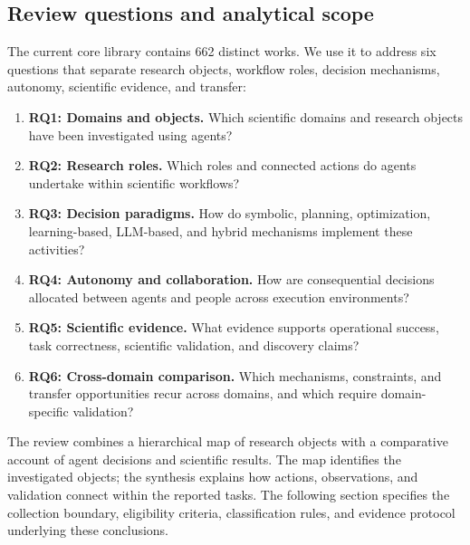 \subsection{Review questions and analytical scope}

The current core library contains 662 distinct works. We use it to address six questions that separate research objects, workflow roles, decision mechanisms, autonomy, scientific evidence, and transfer:
\begin{enumerate}
    \item \textbf{RQ1: Domains and objects.} Which scientific domains and research objects have been investigated using agents?
    \item \textbf{RQ2: Research roles.} Which roles and connected actions do agents undertake within scientific workflows?
    \item \textbf{RQ3: Decision paradigms.} How do symbolic, planning, optimization, learning-based, LLM-based, and hybrid mechanisms implement these activities?
    \item \textbf{RQ4: Autonomy and collaboration.} How are consequential decisions allocated between agents and people across execution environments?
    \item \textbf{RQ5: Scientific evidence.} What evidence supports operational success, task correctness, scientific validation, and discovery claims?
    \item \textbf{RQ6: Cross-domain comparison.} Which mechanisms, constraints, and transfer opportunities recur across domains, and which require domain-specific validation?
\end{enumerate}

The review combines a hierarchical map of research objects with a comparative account of agent decisions and scientific results. The map identifies the investigated objects; the synthesis explains how actions, observations, and validation connect within the reported tasks. The following section specifies the collection boundary, eligibility criteria, classification rules, and evidence protocol underlying these conclusions.
